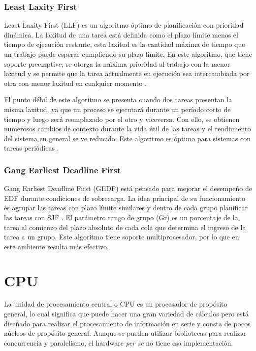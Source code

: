 \subsubsection{Least Laxity First}
Least Laxity First (LLF) es un algoritmo óptimo de planificación con prioridad dinámica. La laxitud de una tarea está definida como el plazo límite menos el tiempo de ejecución restante, esta laxitud es la cantidad máxima de tiempo que un trabajo puede esperar cumpliendo su plazo límite. En este algoritmo, que tiene soporte preemptive, se otorga la máxima prioridad al trabajo con la menor laxitud y se permite que la tarea actualmente en ejecución sea intercambiada por otra con menor laxitud en cualquier momento \cite{NPr}.
\newline
  
  El punto débil de este algoritmo se presenta cuando dos tareas presentan la misma laxitud, ya que un proceso se ejecutará durante un período corto de tiempo y luego será reemplazado por el otro y viceversa. Con ello, se obtienen numerosos cambios de contexto durante la vida útil de las tareas y el rendimiento del sistema en general se ve reducido. Este algoritmo es óptimo para sistemas con tareas periódicas \cite{ComRTT}.
  
\subsubsection{Gang Earliest Deadline First}
Gang Earliest Deadline First (GEDF) está pensado para mejorar el desempeño de EDF durante condiciones de sobrecarga\cite{GEDF}. La idea principal de su funcionamiento es agrupar las tareas con plazo límite similares y dentro de cada grupo planificar las tareas con SJF \cite{ComRTT}. 
El parámetro rango de grupo (Gr) es un porcentaje de la tarea al comienzo del plazo absoluto de cada cola que determina el ingreso de la tarea a un grupo. Este algoritmo tiene soporte multiprocesador, por lo que en este ambiente resulta más efectivo\cite{GEDF}.


        \section{CPU}
    La unidad de procesamiento central o CPU es un procesador de propósito general, lo cual significa que puede hacer una gran variedad de cálculos pero está diseñado para realizar el procesamiento de información en serie y consta de pocos núcleos de propósito general. Aunque se pueden utilizar bibliotecas para realizar concurrencia y paralelismo, el hardware \textit{per se} no tiene esa implementación.

